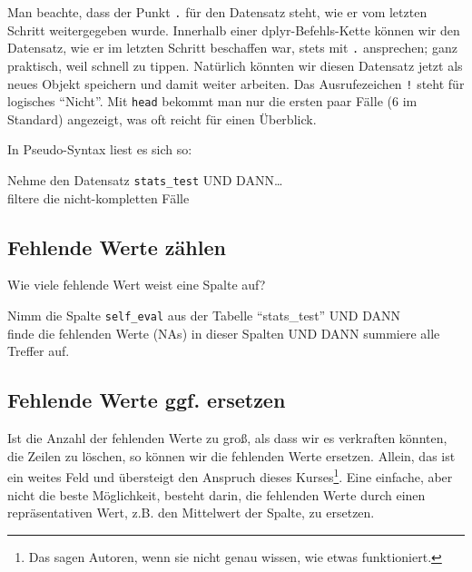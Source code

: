 \documentclass[12pt,ngerman,]{book}
\makeatletter
\newenvironment{Shaded}{\begin{snugshade}}{\end{snugshade}}
\newcommand{\StringTok}[1]{\textcolor[rgb]{0.31,0.60,0.02}{#1}}
\newcommand{\CommentTok}[1]{\textcolor[rgb]{0.56,0.35,0.01}{\textit{#1}}}
\newcommand{\OperatorTok}[1]{\textcolor[rgb]{0.81,0.36,0.00}{\textbf{#1}}}
\newcommand{\NormalTok}[1]{#1}
\let\rmarkdownfootnote\footnote%
\def\footnote{\protect\rmarkdownfootnote}
\newenvironment{kframe}{%
\medskip{}
\setlength{\fboxsep}{.8em}
 \def\at@end@of@kframe{}%
 \ifinner\ifhmode%
  \def\at@end@of@kframe{\end{minipage}}%
  \begin{minipage}{\columnwidth}%
 \fi\fi%
 \def\FrameCommand##1{\hskip\@totalleftmargin \hskip-\fboxsep
 \colorbox{shadecolor}{##1}\hskip-\fboxsep
     \hskip-\linewidth \hskip-\@totalleftmargin \hskip\columnwidth}%
 \MakeFramed {\advance\hsize-\width
   \@totalleftmargin\z@ \linewidth\hsize
   \@setminipage}}%
 {\par\unskip\endMakeFramed%
 \at@end@of@kframe}
\renewenvironment{Shaded}{\begin{kframe}}{\end{kframe}}
\theoremstyle{definition}
\theoremstyle{definition}
\theoremstyle{remark}
\let\BeginKnitrBlock\begin \let\EndKnitrBlock\end
\makeatother
\begin{document}
\BeginKnitrBlock{rmdcaution}
Man beachte, dass der Punkt \texttt{.} für den Datensatz steht, wie er
vom letzten Schritt weitergegeben wurde. Innerhalb einer
dplyr-Befehls-Kette können wir den Datensatz, wie er im letzten Schritt
beschaffen war, stets mit \texttt{.} ansprechen; ganz praktisch, weil
schnell zu tippen. Natürlich könnten wir diesen Datensatz jetzt als
neues Objekt speichern und damit weiter arbeiten. Das Ausrufezeichen
\texttt{!} steht für logisches ``Nicht''. Mit \texttt{head} bekommt man
nur die ersten paar Fälle (6 im Standard) angezeigt, was oft reicht für
einen Überblick.
\EndKnitrBlock{rmdcaution}

In Pseudo-Syntax liest es sich so:

\BeginKnitrBlock{rmdpseudocode}
Nehme den Datensatz \texttt{stats\_test} UND DANN\ldots{}\\
filtere die nicht-kompletten Fälle
\EndKnitrBlock{rmdpseudocode}

\subsection{Fehlende Werte zählen}\label{fehlende-werte-zahlen}

Wie viele fehlende Wert weist eine Spalte auf?

\begin{Shaded}
\end{Shaded}

\BeginKnitrBlock{rmdpseudocode}
Nimm die Spalte \texttt{self\_eval} aus der Tabelle ``stats\_test'' UND
DANN\\
finde die fehlenden Werte (NAs) in dieser Spalten UND DANN summiere alle
Treffer auf.
\EndKnitrBlock{rmdpseudocode}

\subsection{Fehlende Werte ggf.
ersetzen}\label{fehlende-werte-ggf.-ersetzen}

Ist die Anzahl der fehlenden Werte zu groß, als dass wir es verkraften
könnten, die Zeilen zu löschen, so können wir die fehlenden Werte
ersetzen. Allein, das ist ein weites Feld und übersteigt den Anspruch
dieses Kurses\footnote{Das sagen Autoren, wenn sie nicht genau wissen,
  wie etwas funktioniert.}. Eine einfache, aber nicht die beste
Möglichkeit, besteht darin, die fehlenden Werte durch einen
repräsentativen Wert, z.B. den Mittelwert der Spalte, zu ersetzen.
\end{document}
